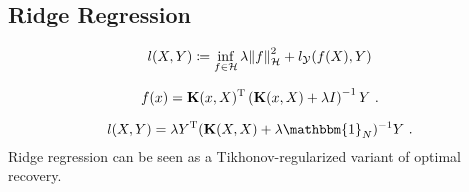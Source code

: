 \subsection{Ridge Regression}

\begin{equation}
	\label{eq:ridge-regression-loss}
	l(X, Y) \coloneqq \inf_{f \in \mathcal{H}} \lambda \norm{f}_\mathcal{H}^2 
	+ l_{\mathcal{Y}} (f(X), Y)
\end{equation}

\begin{equation}
	\label{eq:ridge-regression-f}
	f(x) = \mathbf{K}(x, X)^{\mathrm{T}} \left(\mathbf{K}(x, X) + \lambda I\right)^{-1}Y \ .
\end{equation}

\begin{equation}
	\label{eq:ridge-regression-loss-se-closed-form}
	l(X, Y) = \lambda Y^\T (\mathbf{K}(X, X) + \lambda \mathbbm{1}_N)^{-1} Y \ .
\end{equation}
Ridge regression can be seen as a Tikhonov-regularized variant of optimal recovery.